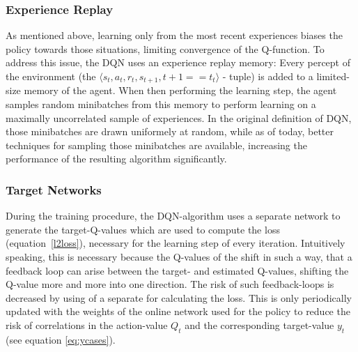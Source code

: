 \subsubsection*{Experience Replay}
As mentioned above, learning only from the most recent experiences biases the policy towards those situations, limiting convergence of the Q-function. To address this issue, the DQN uses an experience replay memory: Every percept of the environment (the $\langle s_t, a_t, r_t, s_{t+1}, t+1==t_t \rangle$ - tuple) is added to a limited-size memory of the agent. When then performing the learning step, the agent samples random minibatches from this memory to perform learning on a maximally uncorrelated sample of experiences. In the original definition of DQN, those minibatches are drawn uniformely at random, while as of today, better techniques for sampling those minibatches are available\cite{schaul_prioritized_2015}, increasing the performance of the resulting algorithm significantly. %

\subsubsection*{Target Networks}
During the training procedure, the DQN-algorithm uses a separate network to generate the target-Q-values which are used to compute the loss (equation~\ref{l2loss}), necessary for the learning step of every iteration. Intuitively speaking, this is necessary because the Q-values of the  shift in such a way, that a feedback loop can arise between the target- and estimated Q-values, shifting the Q-value more and more into one direction. %
The risk of such feedback-loops is decreased by using of a separate  for calculating the loss. This is only periodically updated with the weights of the online network used for the policy to reduce the risk of correlations in the action-value $Q_t$ and the corresponding target-value $y_t$ (see equation \ref{eq:ycases}).\\

